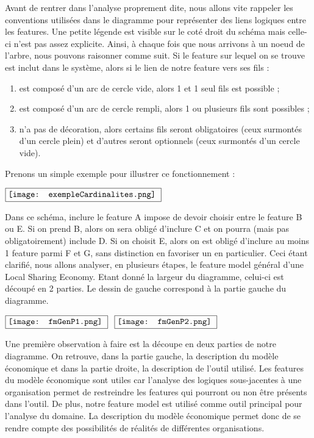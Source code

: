 Avant de rentrer dans l'analyse proprement dite,  nous allons vite rappeler les conventions utilisées dans le diagramme pour représenter des liens logiques entre les features.  Une petite légende est visible sur le coté droit du schéma mais celle-ci n'est pas assez explicite.  Ainsi,  à chaque fois que nous arrivons à un noeud de l'arbre,  nous pouvons raisonner comme suit.  Si le feature sur lequel on se trouve est inclut dans le système,  alors si le lien de notre feature vers ses fils : 
\begin{enumerate}
\item{est composé d'un arc de cercle vide,  alors 1 et 1 seul fils est possible ;}
\item{est composé d'un arc de cercle rempli,  alors 1 ou plusieurs fils sont possibles ;}
\item{n'a pas de décoration,  alors certains fils seront obligatoires (ceux surmontés d'un cercle plein) et d'autres seront optionnels (ceux surmontés d'un cercle vide).}
\end{enumerate}

Prenons un simple exemple pour illustrer ce fonctionnement : \\

\begin{minipage}{0.25\linewidth}
$\vcenter{\hbox{\fbox{\texttt{[image: exempleCardinalites.png]} } }}$
\end{minipage}
\begin{minipage}{0.7\linewidth} 
Dans ce schéma,  inclure le feature A impose de devoir choisir entre le feature B ou E.  Si on prend B,  alors on sera obligé d'inclure C et on pourra (mais pas obligatoirement) include D.  Si on choisit E,  alors on est obligé d'inclure au moins 1 feature parmi F et G,  sans distinction en favoriser un en particulier.
Ceci étant clarifié,  nous allons analyser,  en plusieurs étapes,  le feature model général d'une Local Sharing Economy.  Etant donné la largeur du diagramme,  celui-ci est découpé en 2 parties.  
Le dessin de gauche correspond à la partie gauche du diagramme.
\end{minipage}

$\vcenter{\hbox{\fbox{\texttt{[image: fmGenP1.png]} } }}$ \hspace{3 cm}
$\vcenter{\hbox{\fbox{\texttt{[image: fmGenP2.png]} } }}$

Une première observation à faire est la découpe en deux parties de notre diagramme.  On retrouve,  dans la partie gauche,  la description du modèle économique et dans la partie droite,  la description de l'outil utilisé.  Les features du modèle économique sont utiles car l'analyse des logiques sous-jacentes à une organisation permet de restreindre les features qui pourront ou non être présents dans l'outil.  De plus,  notre feature model est utilisé comme outil principal pour l'analyse du domaine.  La description du modèle économique permet donc de se rendre compte des possibilités de réalités de différentes organisations.  

